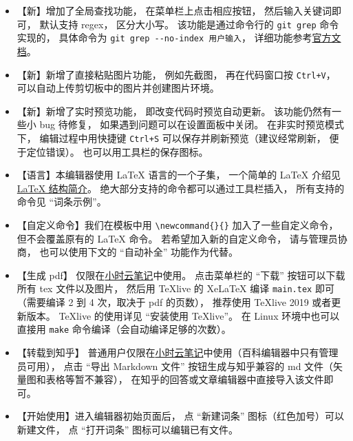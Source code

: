 \begin{itemize}
\item 【新】增加了全局查找功能， 在菜单栏上点击相应按钮， 然后输入关键词即可， 默认支持 regex， 区分大小写。 该功能是通过命令行的 \verb|git grep| 命令实现的， 具体命令为 \verb|git grep --no-index 用户输入|， 详细功能参考\href{https://git-scm.com/docs/git-grep}{官方文档}。
\item 【新】新增了直接粘贴图片功能， 例如先截图， 再在代码窗口按 \verb|Ctrl+V|， 可以自动上传剪切板中的图片并创建图片环境。
\item 【新】新增了实时预览功能， 即改变代码时预览自动更新。 该功能仍然有一些小 bug 待修复， 如果遇到问题可以在设置面板中关闭。 在非实时预览模式下， 编辑过程中用快捷键 \verb|Ctrl+S| 可以保存并刷新预览（建议经常刷新， 便于定位错误）。 也可以用工具栏的保存图标。
\item 【语言】本编辑器使用 LaTeX 语言的一个子集， 一个简单的 LaTeX 介绍见 \href{https://wuli.wiki/online/latxIn.html}{LaTeX 结构简介}。 绝大部分支持的命令都可以通过工具栏插入， 所有支持的命令见 “词条示例”。
\item 【自定义命令】我们在模板中用 \verb|\newcommand{}{}| 加入了一些自定义命令， 但不会覆盖原有的 LaTeX 命令。 若希望加入新的自定义命令， 请与管理员协商， 也可以使用下文的 “自动补全” 功能作为代替。
\item 【生成 pdf】 仅限在\href{http://wuli.wiki/note/}{小时云笔记}中使用。 点击菜单栏的 “下载” 按钮可以下载所有 tex 文件以及图片， 然后用 TeXlive 的 XeLaTeX 编译 \verb|main.tex| 即可（需要编译 2 到 4 次，取决于 pdf 的页数）， 推荐使用 TeXlive 2019 或者更新版本。 TeXlive 的使用详见 “安装使用 TeXlive”。 在 Linux 环境中也可以直接用 \verb|make| 命令编译（会自动编译足够的次数）。
\item 【转载到知乎】 普通用户仅限在\href{http://wuli.wiki/note/}{小时云笔记}中使用（百科编辑器中只有管理员可用）， 点击 “导出 Markdown 文件” 按钮生成与知乎兼容的 md 文件（矢量图和表格等暂不兼容）， 在知乎的回答或文章编辑器中直接导入该文件即可。
\item 【开始使用】进入编辑器初始页面后， 点 “新建词条” 图标（红色加号）可以新建文件， 点 “打开词条” 图标可以编辑已有文件。

\end{itemize}

